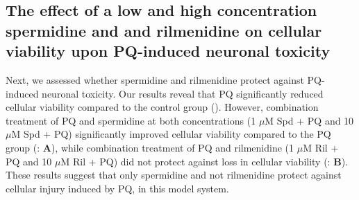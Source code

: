 \subsection{The effect of a low and high concentration spermidine and and rilmenidine on cellular viability upon PQ-induced neuronal toxicity} 
Next, we assessed whether spermidine and rilmenidine protect against PQ-induced neuronal toxicity. Our results reveal that PQ significantly reduced cellular viability compared to the control group (). However, combination treatment of PQ and spermidine at both concentrations (1 $\mu$M Spd + PQ and 10 $\mu$M Spd + PQ) significantly improved cellular viability compared to the PQ group (: \textbf{A}), while combination treatment of PQ and rilmenidine (1 $\mu$M Ril + PQ and 10 $\mu$M Ril + PQ) did not protect against loss in cellular viability (: \textbf{B}). These results suggest that only spermidine and not rilmenidine protect against cellular injury induced by PQ, in this model system.


